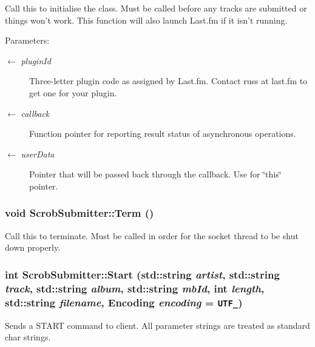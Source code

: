 Call this to initialise the class. Must be called before any tracks are submitted or things won't work. This function will also launch Last.fm if it isn't running.

\begin{Desc}
\item[Parameters:]
\begin{description}
\item[\mbox{$\leftarrow$} {\em pluginId}]Three-letter plugin code as assigned by Last.fm. Contact russ at last.fm to get one for your plugin. \item[\mbox{$\leftarrow$} {\em callback}]Function pointer for reporting result status of asynchronous operations. \item[\mbox{$\leftarrow$} {\em userData}]Pointer that will be passed back through the callback. Use for \char`\"{}this\char`\"{} pointer. \end{description}
\end{Desc}
\subsubsection{\setlength{\rightskip}{0pt plus 5cm}void ScrobSubmitter::Term ()}\label{class_scrob_submitter_9be66164b646c08bdf2f183af7f8a115}


Call this to terminate. Must be called in order for the socket thread to be shut down properly. 
\subsubsection{\setlength{\rightskip}{0pt plus 5cm}int ScrobSubmitter::Start (std::string {\em artist}, std::string {\em track}, std::string {\em album}, std::string {\em mbId}, int {\em length}, std::string {\em filename}, {\bf Encoding} {\em encoding} = {\tt UTF\_})}\label{class_scrob_submitter_2cc75a9528f6ba5feb79f22223945d33}


Sends a START command to client. All parameter strings are treated as standard char strings.

